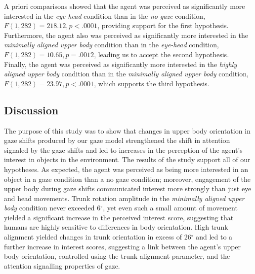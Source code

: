 A priori comparisons showed that the agent was perceived as significantly more interested in the \emph{eye-head} condition than in the \emph{no gaze} condition, $F(1, 282) = 218.12, p < .0001$, providing support for the first hypothesis. Furthermore, the agent also was perceived as significantly more interested in the \emph{minimally aligned upper body} condition than in the \emph{eye-head} condition, $F(1, 282) = 10.65, p = .0012$, leading us to accept the second hypothesis. Finally, the agent was perceived as significantly more interested in the \emph{highly aligned upper body} condition than in the \emph{minimally aligned upper body} condition, $F(1, 282) = 23.97, p < .0001$, which supports the third hypothesis.

\subsection{Discussion}

The purpose of this study was to show that changes in upper body orientation in gaze shifts produced by our gaze model strengthened the shift in attention signaled by the gaze shifts and led to increases in the perception of the agent's interest in objects in the environment. The results of the study support all of our hypotheses. As expected, the agent was perceived as being more interested in an object in a gaze condition than a no gaze condition; moreover, engagement of the upper body during gaze shifts communicated interest more strongly than just eye and head movements. Trunk rotation amplitude in the \emph{minimally aligned upper body} condition never exceeded 6$^{\circ}$, yet even such a small amount of movement yielded a significant increase in the perceived interest score, suggesting that humans are highly sensitive to differences in body orientation. High trunk alignment yielded changes in trunk orientation in excess of 26$^{\circ}$ and led to a further increase in interest scores, suggesting a link between the agent's upper body orientation, controlled using the trunk alignment parameter, and the attention signalling properties of gaze. 